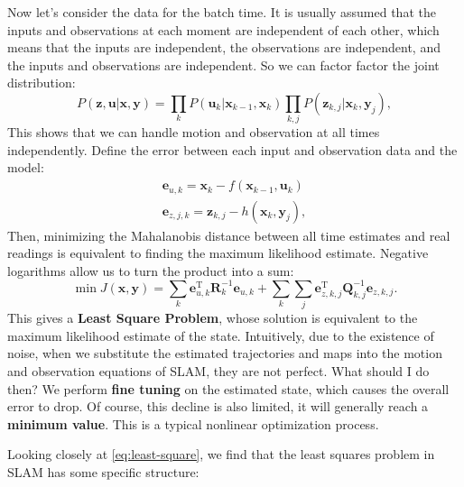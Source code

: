 Now let's consider the data for the batch time. It is usually assumed that the inputs and observations at each moment are independent of each other, which means that the inputs are independent, the observations are independent, and the inputs and observations are independent. So we can factor factor the joint distribution:
\begin{equation}
P\left( {\bm{z},\bm{u}|\bm{x},\bm{y}} \right) = \prod\limits_k {P\left( {{\bm{u}_k }|{\bm{x}_{k - 1}},{\bm{x}_k}} \right)} \prod\limits_{k,j} {P\left( {{\bm{z} _{k,j}}|{\bm{x}_k},{\bm{y}_j}} \right)},
\end{equation}
This shows that we can handle motion and observation at all times independently. Define the error between each input and observation data and the model:
\begin{equation}
\begin{array}{l}
{\bm{e}_{u,k}} = {\bm{x}_k} - f\left( {{\bm{x}_{k - 1}},{\bm{u}_k} } \right)\\
{\bm{e}_{z,j,k}} = {\bm{z}_{k,j}} - h\left( {{\bm{x}_k},{\bm{y} _j}} \right),
\end{array}
\end{equation}
Then, minimizing the Mahalanobis distance between all time estimates and real readings is equivalent to finding the maximum likelihood estimate. Negative logarithms allow us to turn the product into a sum:
\begin{equation}
\label{eq:least-square}
\min J (\bm{x},\bm{y}) = \sum\limits_k {\bm{e}_{u,k}^\mathrm{T} \bm{R}_k^{ - 1} { \bm{e}_{u,k}}} + \sum\limits_k {\sum\limits_j {\bm{e}_{z,k,j}^\mathrm{T} \bm{Q}_ {k,j}^{ - 1}{\bm{e}_{z,k,j}}} } .
\end{equation}
This gives a \textbf{Least Square Problem}, whose solution is equivalent to the maximum likelihood estimate of the state. Intuitively, due to the existence of noise, when we substitute the estimated trajectories and maps into the motion and observation equations of SLAM, they are not perfect. What should I do then? We perform \textbf{fine tuning} on the estimated state, which causes the overall error to drop. Of course, this decline is also limited, it will generally reach a \textbf {minimum value}. This is a typical nonlinear optimization process.

Looking closely at \eqref{eq:least-square}, we find that the least squares problem in SLAM has some specific structure:

